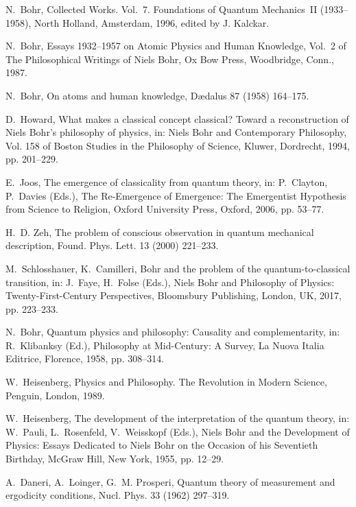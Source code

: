 \documentclass[3p,sort&compress]{elsarticle}
\begin{document}
\begin{thebibliography}{100}
N.~Bohr, Collected {W}orks. {V}ol.~7. Foundations of Quantum Mechanics~II
  (1933--1958), North Holland, Amsterdam, 1996, edited by J. Kalckar.

N.~Bohr, Essays 1932--1957 on Atomic Physics and Human Knowledge, Vol.~2 of The
  Philosophical Writings of Niels Bohr, Ox Bow Press, Woodbridge, Conn., 1987.

N.~Bohr, On atoms and human knowledge, D{\ae}dalus 87 (1958) 164--175.

D.~Howard, What makes a classical concept classical? {T}oward a reconstruction
  of {N}iels {B}ohr's philosophy of physics, in: Niels Bohr and Contemporary
  Philosophy, Vol. 158 of Boston Studies in the Philosophy of Science, Kluwer,
  Dordrecht, 1994, pp. 201--229.

E.~Joos, The emergence of classicality from quantum theory, in: P.~Clayton,
  P.~Davies (Eds.), The Re-Emergence of Emergence: The Emergentist Hypothesis
  from Science to Religion, Oxford University Press, Oxford, 2006, pp. 53--77.

H.~D. Zeh, The problem of conscious observation in quantum mechanical
  description, Found. Phys. Lett. 13 (2000) 221--233.

M.~Schlosshauer, K.~Camilleri, Bohr and the problem of the quantum-to-classical
  transition, in: J.~Faye, H.~Folse (Eds.), Niels Bohr and Philosophy of
  Physics: Twenty-First-Century Perspectives, Bloomsbury Publishing, London,
  UK, 2017, pp. 223--233.

N.~Bohr, Quantum physics and philosophy: Causality and complementarity, in:
  R.~Klibanksy (Ed.), Philosophy at Mid-Century: A Survey, La Nuova Italia
  Editrice, Florence, 1958, pp. 308--314.

W.~Heisenberg, Physics and Philosophy. The Revolution in Modern Science,
  Penguin, London, 1989.

W.~Heisenberg, The development of the interpretation of the quantum theory, in:
  W.~Pauli, L.~Rosenfeld, V.~Weisskopf (Eds.), Niels Bohr and the Development
  of Physics: Essays Dedicated to Niels Bohr on the Occasion of his Seventieth
  Birthday, McGraw Hill, New York, 1955, pp. 12--29.

A.~Daneri, A.~Loinger, G.~M. Prosperi, Quantum theory of measurement and
  ergodicity conditions, Nucl. Phys. 33 (1962) 297--319.


\end{thebibliography}
\end{document}
